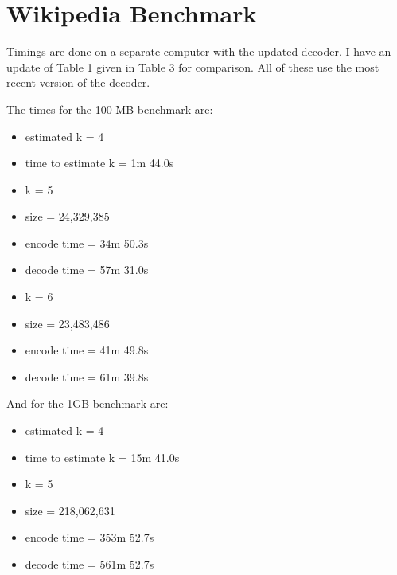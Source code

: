 \documentclass{article}
\begin{document}
\section{Wikipedia Benchmark}

Timings are done on a separate computer with the updated decoder. I have an update of Table 1 given in Table 3 for comparison. All of these use the most recent version of the decoder.

The times for the 100 MB benchmark are:

\begin{itemize}
\item estimated k = 4
\item time to estimate k = 1m 44.0s
\item k = 5
\item size = 24,329,385
\item encode time = 34m 50.3s
\item decode time = 57m 31.0s
\item k = 6
\item size = 23,483,486
\item encode time = 41m 49.8s
\item decode time = 61m 39.8s
\end{itemize}

And for the 1GB benchmark are:

\begin{itemize}
\item estimated k = 4
\item time to estimate k = 15m 41.0s
\item k = 5
\item size = 218,062,631
\item encode time = 353m 52.7s
\item decode time = 561m 52.7s
\end{itemize}
\end{document}

